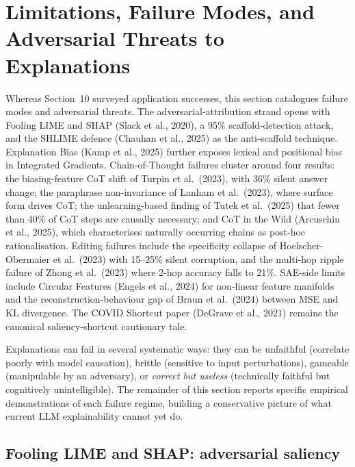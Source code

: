 \section{Limitations, Failure Modes, and Adversarial Threats to Explanations}\label{limitations-failure-modes-and-adversarial-threats-to-explanations}

Whereas Section~10 surveyed application successes, this section catalogues failure modes and adversarial threats. The adversarial-attribution strand opens with Fooling LIME and SHAP (Slack et al., 2020), a 95\% scaffold-detection attack, and the SHLIME defence (Chauhan et al., 2025) as the anti-scaffold technique. Explanation Bias (Kamp et al., 2025) further exposes lexical and positional bias in Integrated Gradients. Chain-of-Thought failures cluster around four results: the biasing-feature CoT shift of Turpin et al.~(2023), with 36\% silent answer change; the paraphrase non-invariance of Lanham et al.~(2023), where surface form drives CoT; the unlearning-based finding of Tutek et al.~(2025) that fewer than 40\% of CoT steps are causally necessary; and CoT in the Wild (Arcuschin et al., 2025), which characterises naturally occurring chains as post-hoc rationalisation. Editing failures include the specificity collapse of Hoelscher-Obermaier et al.~(2023) with 15--25\% silent corruption, and the multi-hop ripple failure of Zhong et al.~(2023) where 2-hop accuracy falls to 21\%. SAE-side limits include Circular Features (Engels et al., 2024) for non-linear feature manifolds and the reconstruction-behaviour gap of Braun et al.~(2024) between MSE and KL divergence. The COVID Shortcut paper (DeGrave et al., 2021) remains the canonical saliency-shortcut cautionary tale.

Explanations can fail in several systematic ways: they can be unfaithful (correlate poorly with model causation), brittle (sensitive to input perturbations), gameable (manipulable by an adversary), or \emph{correct but useless} (technically faithful but cognitively unintelligible). The remainder of this section reports specific empirical demonstrations of each failure regime, building a conservative picture of what current LLM explainability cannot yet do.

\subsection{Fooling LIME and SHAP: adversarial saliency}\label{fooling-lime-and-shap-adversarial-saliency}

